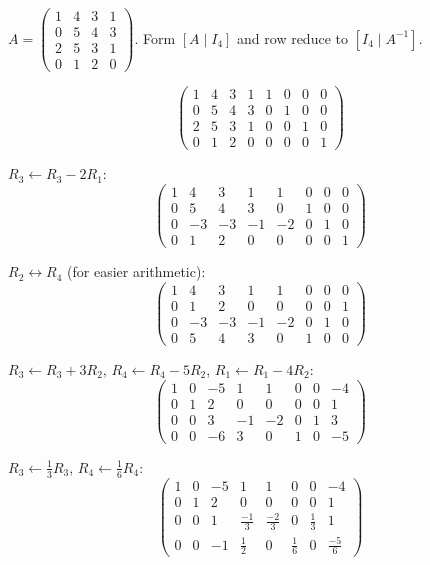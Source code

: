 \documentclass[12pt,a3paper]{article}
\begin{document}
\begin{tcolorbox}[enhanced,breakable,
  colback=cB!4,colframe=cB,boxrule=0.8pt,arc=5pt,
  title={\textbf{Answer --- Inverse of $4\times4$ Matrix by Row Reduction}},
  fonttitle=\bfseries\color{white},colbacktitle=cB]

$A = \begin{pmatrix}1&4&3&1\\0&5&4&3\\2&5&3&1\\0&1&2&0\end{pmatrix}$.
Form $[A \mid I_4]$ and row reduce to $[I_4 \mid A^{-1}]$.

\[
\begin{pmatrix}1&4&3&1&1&0&0&0\\0&5&4&3&0&1&0&0\\2&5&3&1&0&0&1&0\\0&1&2&0&0&0&0&1\end{pmatrix}
\]

$R_3 \leftarrow R_3 - 2R_1$:
\[
\begin{pmatrix}1&4&3&1&1&0&0&0\\0&5&4&3&0&1&0&0\\0&-3&-3&-1&-2&0&1&0\\0&1&2&0&0&0&0&1\end{pmatrix}
\]

$R_2 \leftrightarrow R_4$ (for easier arithmetic):
\[
\begin{pmatrix}1&4&3&1&1&0&0&0\\0&1&2&0&0&0&0&1\\0&-3&-3&-1&-2&0&1&0\\0&5&4&3&0&1&0&0\end{pmatrix}
\]

$R_3 \leftarrow R_3+3R_2$, $R_4 \leftarrow R_4-5R_2$, $R_1 \leftarrow R_1-4R_2$:
\[
\begin{pmatrix}1&0&-5&1&1&0&0&-4\\0&1&2&0&0&0&0&1\\0&0&3&-1&-2&0&1&3\\0&0&-6&3&0&1&0&-5\end{pmatrix}
\]

$R_3 \leftarrow \frac{1}{3}R_3$, $R_4 \leftarrow \frac{1}{6}R_4$:
\[
\begin{pmatrix}1&0&-5&1&1&0&0&-4\\0&1&2&0&0&0&0&1\\0&0&1&\frac{-1}{3}&\frac{-2}{3}&0&\frac{1}{3}&1\\0&0&-1&\frac{1}{2}&0&\frac{1}{6}&0&\frac{-5}{6}\end{pmatrix}
\]


\end{tcolorbox}
\end{document}
